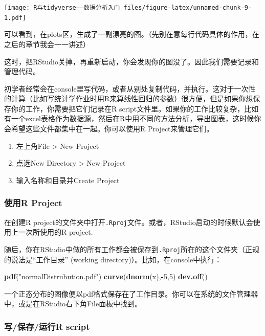 \documentclass[]{book}
\newenvironment{Shaded}{\begin{snugshade}}{\end{snugshade}}
\newcommand{\DecValTok}[1]{\textcolor[rgb]{0.00,0.00,0.81}{#1}}
\newcommand{\KeywordTok}[1]{\textcolor[rgb]{0.13,0.29,0.53}{\textbf{#1}}}
\newcommand{\NormalTok}[1]{#1}
\newcommand{\OperatorTok}[1]{\textcolor[rgb]{0.81,0.36,0.00}{\textbf{#1}}}
\newcommand{\StringTok}[1]{\textcolor[rgb]{0.31,0.60,0.02}{#1}}
\providecommand{\tightlist}{%
  \setlength{\itemsep}{0pt}\setlength{\parskip}{0pt}}
\begin{document}
\texttt{[image: R与tidyverse——数据分析入门\_files/figure-latex/unnamed-chunk-9-1.pdf]}

可以看到，在plots区，生成了一副漂亮的图。（先别在意每行代码具体的作用，在之后的章节我会一一讲述）

这时，把RStudio关掉，再重新启动，你会发现你的图没了。因此我们需要记录和管理代码。

初学者经常会在console里写代码，或者从别处复制代码，并执行。这对于一次性的计算（比如写统计学作业时用R来算线性回归的参数）很方便，但是如果你想保存你的工作，你需要把它们记录在R script文件里。如果你的工作比较复杂，比如有一个excel表格作为数据源，然后在R中用不同的方法分析，导出图表，这时候你会希望这些文件都集中在一起。你可以使用R Project来管理它们。

\begin{enumerate}
\def\labelenumi{\arabic{enumi}.}
\tightlist
\item
  左上角File \textgreater{} New Project
\item
  点选New Directory \textgreater{} New Project
\item
  输入名称和目录并Create Project
\end{enumerate}

\hypertarget{project-use}{%
\subsubsection{使用R Project}\label{project-use}}

在创建R project的文件夹中打开\texttt{.Rproj}文件。或者，RStudio启动的时候默认会使用上一次所使用的R project.

随后，你在RStudio中做的所有工作都会被保存到\texttt{.Rproj}所在的这个文件夹（正规的说法是``工作目录'' (working directory)）。比如，在console中执行：

\begin{Shaded}
\begin{Highlighting}[]
\KeywordTok{pdf}\NormalTok{(}\StringTok{"normalDistrubution.pdf"}\NormalTok{)}
\KeywordTok{curve}\NormalTok{(}\KeywordTok{dnorm}\NormalTok{(x),}\OperatorTok{-}\DecValTok{5}\NormalTok{,}\DecValTok{5}\NormalTok{)}
\KeywordTok{dev.off}\NormalTok{()}
\end{Highlighting}
\end{Shaded}

一个正态分布的图像便以pdf格式保存在了工作目录。你可以在系统的文件管理器中，或是在RStudio右下角File面板中找到。

\hypertarget{Rscript}{%
\subsubsection{写/保存/运行R script}\label{Rscript}}
\end{document}
